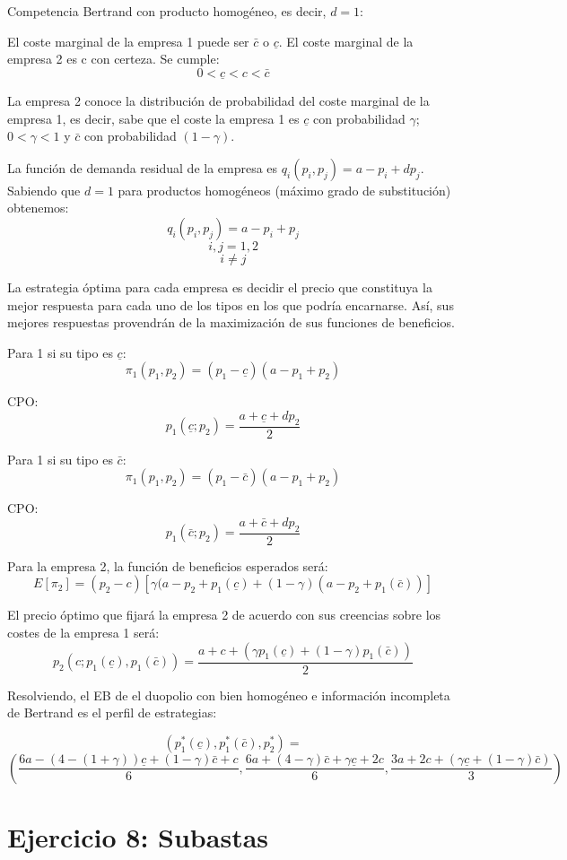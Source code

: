 \documentclass{article}
\begin{document}
Competencia Bertrand con producto homog\'eneo, es decir, $d=1$:

El coste marginal de la empresa 1 puede ser $\bar{c}$ o $\underline{c}$.
El coste marginal de la empresa 2 es c con certeza.
Se cumple:
$$0<\underline{c}<c<\bar{c}$$

La empresa 2 conoce la distribuci\'on de probabilidad del coste marginal de la empresa 1, es decir, sabe que el coste la empresa 1 es $\underline{c}$ con probabilidad $\gamma$; $0<\gamma<1$ y $\bar{c}$ con probabilidad $(1-\gamma)$.

La funci\'on de demanda residual de la empresa es $q_i(p_i,p_j)=a-p_i+dp_j$. Sabiendo que $d=1$ para productos homog\'eneos (m\'aximo grado de substituci\'on) obtenemos:
$$q_i(p_i,p_j)=a-p_i+p_j$$ $$i,j=1,2$$ $$i\neq j$$

La estrategia \'optima para cada empresa es decidir el precio que constituya la mejor respuesta para cada uno de los tipos  en los que podr\'ia encarnarse. As\'i, sus mejores respuestas provendr\'an de la maximizaci\'on de sus funciones de beneficios.

Para 1 si su tipo es $\underline{c}$:
$$\pi_1(p_1,p_2)=(p_1-\underline{c})(a-p_1+p_2)$$

CPO:
$$p_1(\underline{c};p_2)=\frac{a+\underline{c}+dp_2}{2}$$

Para 1 si su tipo es $\bar{c}$:
$$\pi_1(p_1,p_2)=(p_1-\bar{c})(a-p_1+p_2)$$

CPO:
$$p_1(\bar{c};p_2)=\frac{a+\bar{c}+dp_2}{2}$$

Para la empresa 2, la funci\'on de beneficios esperados ser\'a:
$$E[\pi_2]=(p_2-c)[\gamma(a-p_2+p_1(\underline{c})+(1-\gamma)(a-p_2+p_1(\bar{c}))]$$

El precio \'optimo que fijar\'a la empresa 2 de acuerdo con sus creencias sobre los costes de la empresa 1 ser\'a:
$$p_2(c;p_1(\underline{c}),p_1(\bar{c}))=\frac{a+c+(\gamma p_1(\underline{c})+(1-\gamma)p_1(\bar{c}))}{2}$$

Resolviendo, el EB de el duopolio con bien homog\'eneo e informaci\'on incompleta de Bertrand es el perfil de estrategias:

$${(p_1^*(\underline{c}),p_1^*(\bar{c}),p_2^*)}=$$
\hspace{2cm}
$${(\frac{6a-(4-(1+\gamma))\underline{c}+(1-\gamma)\bar{c}+c}{6},\frac{6a+(4-\gamma)\bar{c}+\gamma \underline{c}+2c}{6},\frac{3a+2c+(\gamma \underline{c}+(1-\gamma)\bar{c})}{3})}$$




\section{Ejercicio 8: Subastas}
\end{document}
